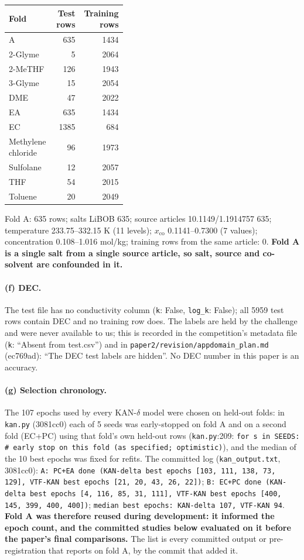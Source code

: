 {\footnotesize\setlength{\tabcolsep}{3pt}
\begin{longtable}{R{0.4\linewidth} r r}
\toprule
Fold & Test rows & Training rows \\
\midrule
\endhead
A & 635 & 1434 \\
2-Glyme & 5 & 2064 \\
2-MeTHF & 126 & 1943 \\
3-Glyme & 15 & 2054 \\
DME & 47 & 2022 \\
EA & 635 & 1434 \\
EC & 1385 & 684 \\
Methylene chloride & 96 & 1973 \\
Sulfolane & 12 & 2057 \\
THF & 54 & 2015 \\
Toluene & 20 & 2049 \\
\bottomrule
\end{longtable}}
Fold A: 635 rows; salts LiBOB 635; source articles 10.1149/1.1914757 635; temperature 233.75--332.15 K (11 levels); $x_{\mathrm{co}}$ 0.1141--0.7300 (7 values); concentration 0.108--1.016 mol/kg; training rows from the same article: 0. \textbf{Fold A is a single salt from a single source article, so salt, source and co-solvent are confounded in it.}

\paragraph{(f) DEC.} The test file has no conductivity column (\texttt{k}: False, \texttt{log\_k}: False); all 5959 test rows contain DEC and no training row does. The labels are held by the challenge and were never available to us; this is recorded in the competition's metadata file (\texttt{k}: ``Absent from test.csv'') and in \texttt{paper2/\allowbreak{}revision/\allowbreak{}appdomain\_\allowbreak{}plan.md} (ec769ad): ``The DEC test labels are hidden''. No DEC number in this paper is an accuracy.

\paragraph{(g) Selection chronology.} The 107 epochs used by every KAN-$\delta$ model were chosen on held-out folds: in \texttt{kan.py} (3081cc0) each of 5 seeds was early-stopped on fold A and on a second fold (EC+PC) using that fold's own held-out rows (\texttt{kan.py}:209: \texttt{for s in SEEDS:  \# early stop on this fold (as specified; optimistic)}), and the median of the 10 best epochs was fixed for refits. The committed log (\texttt{kan\_\allowbreak{}output.txt}, 3081cc0): \texttt{A: PC+EA done (KAN-delta best epochs [103, 111, 138, 73, 129], VTF-KAN best epochs [21, 20, 43, 26, 22])}; \texttt{B: EC+PC done (KAN-delta best epochs [4, 116, 85, 31, 111], VTF-KAN best epochs [400, 145, 399, 400, 400])}; \texttt{median best epochs: KAN-delta 107, VTF-KAN 94}. \textbf{Fold A was therefore reused during development: it informed the epoch count, and the committed studies below evaluated on it before the paper's final comparisons.} The list is every committed output or pre-registration that reports on fold A, by the commit that added it.

